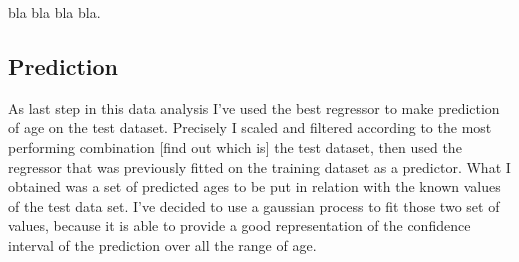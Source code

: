 \documentclass[11pt,a4paper]{report}
\begin{document}
bla bla bla bla.

\subsection*{Prediction}
As last step in this data analysis I've used the best regressor to make prediction of age on the test dataset.
Precisely I scaled and filtered according to the most performing combination [find out which is] the test dataset, then used the regressor that was previously fitted on the training dataset as a predictor. What I obtained was a set of predicted ages to be put in relation with the known values of the test data set.
I've decided to use a gaussian process to fit those two set of values, because it is able to provide a good representation of the confidence interval of the prediction over all the range of age.
\end{document}
